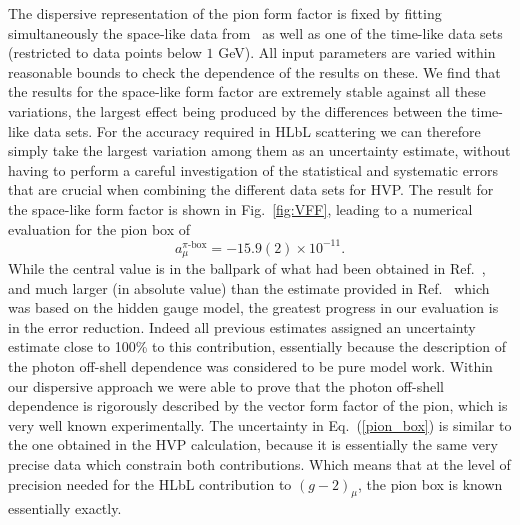 \documentclass[epj]{webofc}
\newcommand{\<}{\langle}
\renewcommand{\>}{\rangle}
\begin{document}
The dispersive representation of the pion form factor is fixed by fitting
simultaneously the space-like data from~\cite{Amendolia:1986wj} as well
as one of the time-like data
sets~\cite{Achasov:2006vp,Akhmetshin:2006bx,Aubert:2009ad,Ambrosino:2010bv,Babusci:2012rp,Ablikim:2015orh}
(restricted to data points below $1$ GeV). All input parameters are varied
within reasonable bounds to check the dependence of the results on these.
We find that the results for the space-like form factor are extremely
stable against all these variations, the largest effect being produced by the
differences between the time-like data sets. For the accuracy required in
HLbL scattering we can therefore simply take the largest variation among them as
an uncertainty estimate, without having to perform a careful investigation
of the statistical and systematic errors that are crucial when combining
the different data sets for HVP.  
The result for the space-like form factor is shown in Fig.~\ref{fig:VFF},
leading to a numerical evaluation for the pion box of 
\begin{equation}
\label{pion_box}
a_\mu^{\pi\text{-box}}=-15.9(2)\times 10^{-11}.
\end{equation}
While the central value is in the ballpark of what had been obtained in
Ref.~\cite{Bijnens:1995xf}, and much larger (in absolute value) than the
estimate provided in Ref.~\cite{Hayakawa:1995ps} which was based on the
hidden gauge model, the greatest progress in our evaluation is in the error
reduction. Indeed all previous estimates assigned an uncertainty estimate
close to 100\% to this contribution, essentially because the description of
the photon off-shell dependence was considered to be pure model
work. Within our dispersive approach we were able to prove that the photon
off-shell dependence is rigorously described by the vector form factor of
the pion, which is very well known experimentally. The uncertainty in
Eq.~(\ref{pion_box}) is similar to the one obtained in the HVP calculation,
because it is essentially the same very precise data which constrain both
contributions. Which means that at the level of precision needed for the
HLbL contribution to $(g-2)_\mu$, the pion box is known essentially
exactly. 
\end{document}
